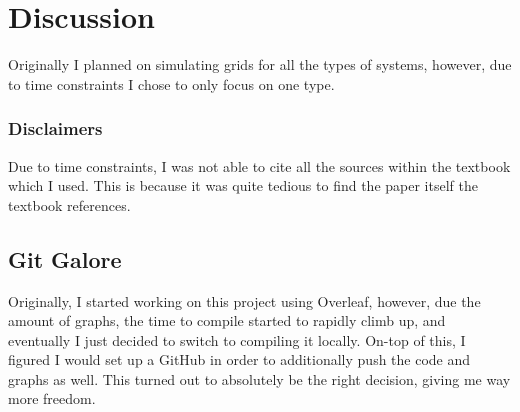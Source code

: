 \documentclass[12pt, a4paper]{article}
\begin{document}
\section{\centering Discussion}   
    Originally I planned on simulating grids for all the types of systems, however, due to time constraints I chose to only focus on one type. 

    \subsubsection{Disclaimers}
        Due to time constraints, I was not able to cite all the sources within the textbook \parencite{TaurisvandenHeuvel+2023} which I used. This is because it was quite tedious to find the paper itself the textbook references. 

    \subsection{Git Galore}
    Originally, I started working on this project using Overleaf, however, due the amount of graphs, the time to compile started to rapidly climb up, and eventually I just decided to switch to compiling it locally. On-top of this, I figured I would set up a GitHub in order to additionally push the code and graphs as well. This turned out to absolutely be the right decision, giving me way more freedom.
    
\printbibliography[
heading=bibintoc,
title={\centering Sources}
]
\end{document}
